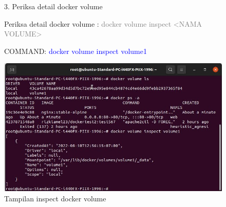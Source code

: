\begin{figure}
    3. Periksa detail docker volume
    
    Periksa detail docker volume : \textcolor{Gray}{docker volume inspect <NAMA VOLUME>}
    
    COMMAND: \textcolor{Blue}{docker volume inspect volume1}
    \begin{center}
        \includegraphics[width=\linewidth]{image/40.jpg}
        \caption{Tampilan inspect docker volume}
        \label{fig:my_figure}
    \end{center}
\end{figure}


